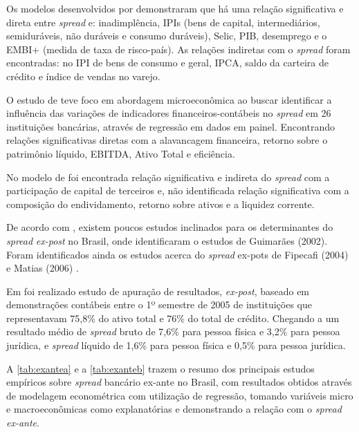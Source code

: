 \documentclass[12pt,12pt,openright,oneside,a4paper,chapter=TITLE,section=TITLE,subsection=TITLE,subsubsection=TITLE,english,french,spanish,portugues,sumario=tradicional]{abntex2}
\begin{document}
Os modelos desenvolvidos por \textcite{durigan:2018} demonstraram que há uma
relação significativa e direta entre \emph{spread} e: inadimplência, IPIs (bens de
capital, intermediários, semiduráveis, não duráveis e consumo duráveis), Selic,
PIB, desemprego e o EMBI+ (medida de taxa de risco-país). As relações indiretas
com o \emph{spread} foram encontradas: no IPI de bens de consumo e geral, IPCA,
saldo da carteira de crédito e índice de vendas no varejo.

O estudo de \textcite{timotio:2018} teve foco em abordagem microeconômica ao
buscar identificar a influência das variações de indicadores
financeiros-contábeis no \emph{spread} em 26 instituições bancárias,
através de regressão em dados em painel. Encontrando relações significativas
diretas com a alavancagem financeira, retorno sobre o patrimônio líquido,
EBITDA, Ativo Total e eficiência.

No modelo de \textcite{timotio:2018} foi encontrada relação significativa e
indireta do \emph{spread} com a participação de capital de terceiros e, não
identificada relação significativa com a composição do endividamento, retorno
sobre ativos e a liquidez corrente.

De acordo com \textcite{durigan:2018, dantas:2012}, existem poucos estudos
inclinados para os determinantes do \emph{spread} \emph{ex-post} no Brasil, onde
identificaram o estudos de Guimarães (2002). Foram identificados ainda os
estudos acerca do \emph{spread} ex-pots de Fipecafi (2004) \cite{dantas:2012} e Matias (2006) \cite{leal:2006}.

Em \textcite{fipecafi:2005} foi realizado estudo de apuração de resultados,
\emph{ex-post}, baseado em demonstrações contábeis entre o 1º semestre de 2005 de
instituições que representavam 75,8\% do ativo total e 76\% do total de crédito.
Chegando a um resultado médio de \emph{spread} bruto de 7,6\% para pessoa física e
3,2\% para pessoa jurídica, e \emph{spread} líquido de 1,6\% para pessoa física e 0,5\%
para pessoa jurídica.

A \autoref{tab:exantea} e a \autoref{tab:exanteb} trazem o resumo dos
principais estudos empíricos sobre \emph{spread} bancário ex-ante no Brasil, com
resultados obtidos através de modelagem econométrica com utilização de
regressão, tomando variáveis micro e macroeconômicas como explanatórias e
demonstrando a relação com o \emph{spread ex-ante}.
\end{document}
